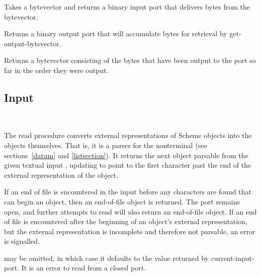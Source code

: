 \begin{entry}{%
}

Takes a bytevector and returns a binary input port that delivers
bytes from the bytevector.

\end{entry}

\begin{entry}{%
}

Returns a binary output port that will accumulate bytes for
retrieval by {\cf get-output-bytevector}.

\end{entry}

\begin{entry}{%
}

  Returns a bytevector consisting
of the bytes that have been output to the port so far in the
order they were output.
\end{entry}


\subsection{Input}
\label{inputsection}

\noindent \hbox{ }  %
\vspace{-5ex}

\begin{entry}{%
}

The {\cf read} procedure converts external representations of Scheme objects into the
objects themselves.  That is, it is a parser for the nonterminal
 (see sections~\ref{datum} and
\ref{listsection}).  It returns the next
object parsable from the given textual input , updating
 to point to
the first character past the end of the external representation of the object.

\vest If an end of file is encountered in the input before any
characters are found that can begin an object, then an end-of-file
object is returned.  The port remains open, and further attempts
to read will also return an end-of-file object.  If an end of file is
encountered after the beginning of an object's external representation,
but the external representation is incomplete and therefore not parsable,
an error is signalled.

 may be omitted, in which case it defaults to the
value returned by {\cf current-input-port}.  It is an error to read from
a closed port.
\end{entry}

